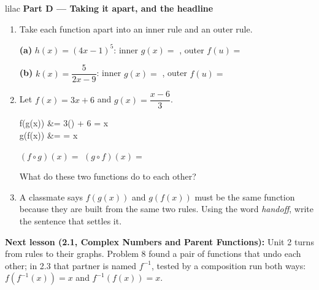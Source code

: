 \documentclass[10pt]{article}
\begin{document}
\vspace{0.1in}

\begin{headlinebox}{lilac}
\textbf{\color{plum}Part D --- Taking it apart, and the headline}
\end{headlinebox}

\begin{enumerate}[leftmargin=1.9em, itemsep=8pt, start=7]

\item Take each function apart into an inner rule and an outer rule.

      \textbf{(a)} $h(x) = (4x - 1)^5$: \quad inner $g(x) = $ , \quad
      outer $f(u) = $ 

      \textbf{(b)} $k(x) = \dfrac{5}{2x - 9}$: \quad inner $g(x) = $ , \quad
      outer $f(u) = $ 

\item Let $f(x) = 3x + 6$ and $g(x) = \dfrac{x - 6}{3}$.

\begin{work}
  f(g(x)) &= 3\!\left(\right) + 6 = x \\
  g(f(x)) &=  = x
\end{work}

      $(f \circ g)(x) = $  \qquad $(g \circ f)(x) = $ 

      What do these two functions do to each other?

\item A classmate says $f(g(x))$ and $g(f(x))$ must be the same function because they are built
      from the same two rules. Using the word \emph{handoff}, write the sentence that settles it.

\end{enumerate}

\vspace{0.08in}

\boxguard[8]
\begin{spiralbox}
\small
\textbf{Next lesson (2.1, Complex Numbers and Parent Functions):} Unit 2 turns from rules to
their graphs. Problem 8 found a pair of functions that undo each other; in 2.3 that partner is
named $f^{-1}$, tested by a composition run both ways: $f(f^{-1}(x)) = x$ and $f^{-1}(f(x)) = x$.
\end{spiralbox}
\end{document}
